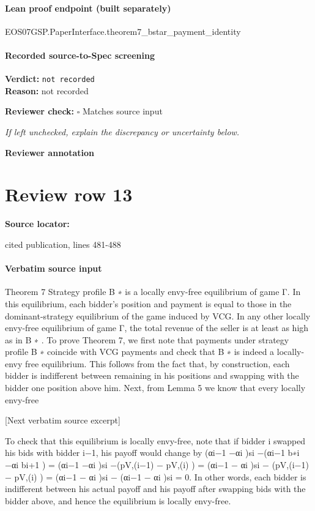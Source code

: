 \documentclass[10pt]{article}
\newcommand{\reviewerbox}{%
  \par\noindent\fbox{\parbox{0.96\linewidth}{\rule{0pt}{0.38in}}}\par
}
\newcommand{\reviewmatch}[1]{%
  \par\noindent\textbf{Reviewer check:} $\square$\; #1\par
  \noindent\emph{If left unchecked, explain the discrepancy or uncertainty below.}\par
}
\begin{document}
\paragraph{Lean proof endpoint (built separately)}\begin{ReviewVerbatim}
EOS07GSP.PaperInterface.theorem7_bstar_payment_identity
\end{ReviewVerbatim}

\paragraph{Recorded source-to-Spec screening}
\textbf{Verdict:} \texttt{not recorded}
\\
\textbf{Reason:} not recorded
\reviewmatch{Matches source input}
\noindent\textbf{Reviewer annotation}\par
\reviewerbox
\clearpage
\hypertarget{source-claim-a33014203291a1ce}{}
\section*{Review row 13}
\textbf{Source locator:} {\footnotesize\raggedright cited publication, lines 481-\allowbreak{}488\par}
\paragraph{Verbatim source input}
\begin{ReviewVerbatim}
Theorem 7 Strategy profile B ∗ is a locally envy-free equilibrium of game Γ. In this equilibrium,
each bidder’s position and payment is equal to those in the dominant-strategy equilibrium of the
game induced by VCG. In any other locally envy-free equilibrium of game Γ, the total revenue of
the seller is at least as high as in B ∗ .
To prove Theorem 7, we first note that payments under strategy profile B ∗ coincide with VCG
payments and check that B ∗ is indeed a locally-envy free equilibrium. This follows from the fact
that, by construction, each bidder is indifferent between remaining in his positions and swapping
with the bidder one position above him. Next, from Lemma 5 we know that every locally envy-free

[Next verbatim source excerpt]

To check that this equilibrium is locally envy-free, note that if bidder i swapped his bids with
bidder i−1, his payoff would change by (αi−1 −αi )si −(αi−1 b∗i −αi bi+1 ) = (αi−1 −αi )si −(pV,(i−1) −
pV,(i) ) = (αi−1 − αi )si − (pV,(i−1) − pV,(i) ) = (αi−1 − αi )si − (αi−1 − αi )si = 0. In other words, each
bidder is indifferent between his actual payoff and his payoff after swapping bids with the bidder
above, and hence the equilibrium is locally envy-free.
\end{ReviewVerbatim}
\end{document}
